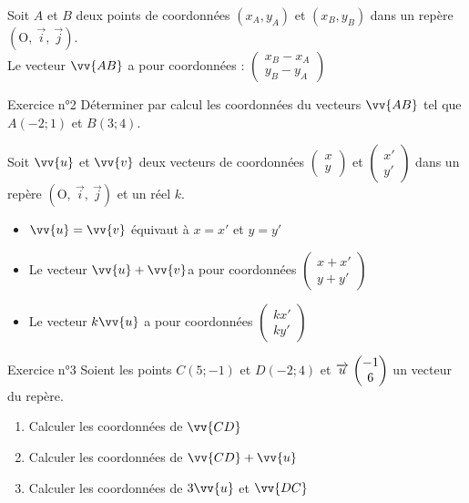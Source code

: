 \documentclass[12pt,a4paper]{article}
\def\Oij{$\left(\text{O},~\vec{i},~\vec{j}\right)$}
\begin{document}
\begin{framed}
\vspace{3cm}
\end{framed}

\begin{pro}
Soit $A$ et $B$ deux points de coordonnées $(x_A,y_A)$ et $(x_B,y_B)$ dans un repère \Oij{}.\\
Le vecteur $\vv{AB}$ a pour coordonnées :
$\begin{pmatrix} 
      x_B-x_A\\ 
      y_B-y_A 
    \end{pmatrix}$
\end{pro}

\begin{mybox}{Exercice n°2}
Déterminer par calcul les coordonnées du vecteurs $\vv{AB}$ tel que $A(-2; 1)$ et $B(3; 4)$.

\end{mybox}

\begin{framed}
\vspace{3cm}
\end{framed}




\begin{pro}
Soit $\vv{u}$ et $\vv{v}$ deux vecteurs de coordonnées 
$\begin{pmatrix} 
      x\\ 
      y
\end{pmatrix}$
et 
$\begin{pmatrix} 
      x'\\ 
      y'
\end{pmatrix}$
dans un repère \Oij{} et un réel $k$.
\begin{itemize}
    \item $\vv{u}=\vv{v}$ équivaut à $x=x'$ et $y=y'$
    \item Le vecteur $\vv{u}+\vv{v}$a pour coordonnées 
    $\begin{pmatrix} 
      x+x'\\ 
      y+y'
\end{pmatrix}$
\item Le vecteur $k\vv{u}$ a pour coordonnées
 $\begin{pmatrix} 
      kx'\\ 
      ky'
\end{pmatrix}$
\end{itemize}
\end{pro}

\begin{mybox}{Exercice n°3}
Soient les points $C(5;-1)$ et $D(-2; 4)$ et $\overrightarrow{u}\, \begin{pmatrix} -1\\ 6 \end{pmatrix}$ un vecteur du repère.\\
\begin{enumerate}
    \item Calculer les coordonnées de $\vv{CD}$
    \item  Calculer les coordonnées de $\vv{CD}+\vv{u}$
    \item Calculer les coordonnées de $3\vv{u}$ et $\vv{DC}$
\end{enumerate}
\end{mybox}
\end{document}
